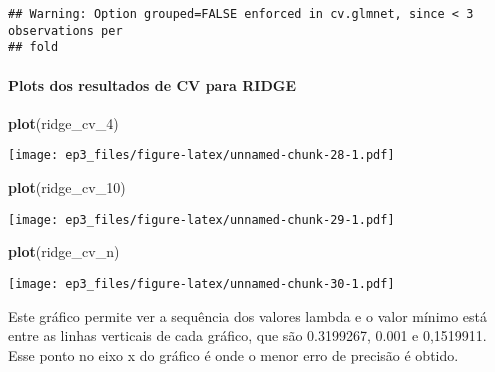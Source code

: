 \documentclass[]{article}
\newenvironment{Shaded}{\begin{snugshade}}{\end{snugshade}}
\newcommand{\DecValTok}[1]{\textcolor[rgb]{0.00,0.00,0.81}{#1}}
\newcommand{\KeywordTok}[1]{\textcolor[rgb]{0.13,0.29,0.53}{\textbf{#1}}}
\newcommand{\NormalTok}[1]{#1}
\newcommand{\OperatorTok}[1]{\textcolor[rgb]{0.81,0.36,0.00}{\textbf{#1}}}
\let\oldparagraph\paragraph
\renewcommand{\paragraph}[1]{\oldparagraph{#1}\mbox{}}
\begin{document}
\begin{verbatim}
## Warning: Option grouped=FALSE enforced in cv.glmnet, since < 3 observations per
## fold
\end{verbatim}

\hypertarget{plots-dos-resultados-de-cv-para-ridge}{%
\paragraph{Plots dos resultados de CV para
RIDGE}\label{plots-dos-resultados-de-cv-para-ridge}}

\begin{Shaded}
\begin{Highlighting}[]
\KeywordTok{plot}\NormalTok{(ridge_cv_}\DecValTok{4}\NormalTok{)}
\end{Highlighting}
\end{Shaded}

\texttt{[image: ep3\_files/figure-latex/unnamed-chunk-28-1.pdf]}

\begin{Shaded}
\begin{Highlighting}[]
\KeywordTok{plot}\NormalTok{(ridge_cv_}\DecValTok{10}\NormalTok{)}
\end{Highlighting}
\end{Shaded}

\texttt{[image: ep3\_files/figure-latex/unnamed-chunk-29-1.pdf]}

\begin{Shaded}
\begin{Highlighting}[]
\KeywordTok{plot}\NormalTok{(ridge_cv_n)}
\end{Highlighting}
\end{Shaded}

\texttt{[image: ep3\_files/figure-latex/unnamed-chunk-30-1.pdf]}

Este gráfico permite ver a sequência dos valores lambda e o valor mínimo
está entre as linhas verticais de cada gráfico, que são 0.3199267, 0.001
e 0,1519911. Esse ponto no eixo x do gráfico é onde o menor erro de
precisão é obtido.

\begin{Shaded}
\end{Shaded}
\end{document}
